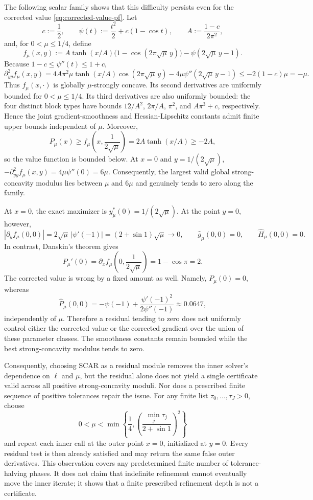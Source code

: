 \documentclass{article}
\begin{document}
The following scalar family shows that this difficulty persists even
for the corrected value \eqref{eq:corrected-value-pf}.  Let
\[
 c:=\frac12,
 \qquad
 \psi(t):=\frac{t^2}{2}+c(1-\cos t),
 \qquad
 A:=\frac{1-c}{2\pi^2},
\]
and, for $0<\mu\le1/4$, define
\begin{equation}\label{eq:scar-counterexample}
 f_\mu(x,y):=A\tanh(x/A)
       \bigl(1-\cos(2\pi\sqrt\mu\,y)\bigr)
       -\psi(2\sqrt\mu\,y-1).
\end{equation}
Because $1-c\le\psi''(t)\le1+c$,
\[
 \partial_{yy}^2 f_\mu(x,y)
 =4A\pi^2\mu\tanh(x/A)\cos(2\pi\sqrt\mu\,y)
   -4\mu\psi''(2\sqrt\mu\,y-1)
 \le-2(1-c)\mu=-\mu.
\]
Thus $f_\mu(x,\cdot)$ is globally $\mu$-strongly concave.  Its
second derivatives are uniformly bounded for $0<\mu\le1/4$.  Its third
derivatives are also uniformly bounded: the four distinct block types
have bounds $12/A^2$, $2\pi/A$, $\pi^2$, and $A\pi^3+c$,
respectively.  Hence the joint gradient-smoothness and
Hessian-Lipschitz constants admit finite upper bounds independent of
$\mu$.  Moreover,
\[
 P_\mu(x)\ge f_\mu\left(x,\frac1{2\sqrt\mu}\right)
 =2A\tanh(x/A)\ge-2A,
\]
so the value function is bounded below.
At $x=0$ and $y=1/(2\sqrt\mu)$,
$-\partial_{yy}^2f_\mu(x,y)=4\mu\psi''(0)=6\mu$.
Consequently, the largest valid global strong-concavity modulus lies
between $\mu$ and $6\mu$ and genuinely tends to zero along the family.

At $x=0$, the exact maximizer is
$y_\mu^*(0)=1/(2\sqrt\mu)$.  At the point $y=0$, however,
\[
 |\partial_yf_\mu(0,0)|
 =2\sqrt\mu\,|\psi'(-1)|
 =(2+\sin 1)\sqrt\mu\longrightarrow0,
 \qquad
 \widehat g_\mu(0,0)=0,
 \qquad
 \widehat H_\mu(0,0)=0.
\]
In contrast, Danskin's theorem gives
\[
 P_\mu'(0)
 =\partial_xf_\mu\left(0,\frac1{2\sqrt\mu}\right)
 =1-\cos\pi=2.
\]
The corrected value is wrong by a fixed amount as well.  Namely,
$P_\mu(0)=0$, whereas
\begin{equation}\label{eq:scar-counterexample-value}
 \widehat P_\mu(0,0)
 =-\psi(-1)+\frac{\psi'(-1)^2}{2\psi''(-1)}
 \approx0.0647,
\end{equation}
independently of $\mu$.  Therefore a residual tending to zero does not
uniformly control either the corrected value or the corrected gradient
over the union of these parameter classes.  The smoothness constants
remain bounded while the best strong-concavity modulus tends to zero.

Consequently, choosing SCAR as a residual module removes the inner
solver's dependence on $\ell$ and $\mu$, but the residual alone does
not yield a single certificate valid across all positive
strong-concavity moduli.  Nor does a prescribed finite sequence of
positive tolerances repair the issue.  For any finite list
$\tau_0,\ldots,\tau_J>0$, choose
\[
 0<\mu<\min\left\{\frac14,
  \left(\frac{\min_j\tau_j}{2+\sin 1}\right)^2\right\}
\]
and repeat each inner call at the outer point $x=0$, initialized at
$y=0$.  Every residual test is then already satisfied and may return
the same false outer derivatives.
This observation covers any predetermined finite number of
tolerance-halving phases.  It does not claim that indefinite
refinement cannot eventually move the inner iterate; it shows that a
finite prescribed refinement depth is not a certificate.
\end{document}
